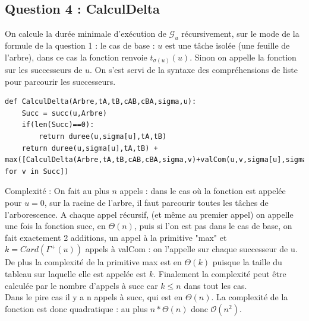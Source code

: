 \documentclass{article}
\begin{document}
\subsection{Question 4 : CalculDelta}
On calcule la durée minimale d'exécution de $\mathcal{G}_u$ récursivement, sur le mode de la formule de la question 1 : 
le cas de base : $u$ est une tâche isolée (une feuille de l'arbre), dans ce cas la fonction renvoie $t_{\sigma(u)}(u)$. Sinon on appelle la fonction sur les successeurs de $u$. On s'est servi de la syntaxe des compréhensions de liste pour parcourir les successeurs.
\begin{lstlisting}
def CalculDelta(Arbre,tA,tB,cAB,cBA,sigma,u):
    Succ = succ(u,Arbre)
    if(len(Succ)==0):
        return duree(u,sigma[u],tA,tB)
    return duree(u,sigma[u],tA,tB) + max([CalculDelta(Arbre,tA,tB,cAB,cBA,sigma,v)+valCom(u,v,sigma[u],sigma[v],cAB,cBA) for v in Succ])
\end{lstlisting}

Complexité : 
On fait au plus $n$ appels : dans le cas où la fonction est appelée pour $u = 0$, sur la racine de l'arbre, il faut parcourir toutes les tâches de l'arborescence. 
A chaque appel récursif, (et même au premier appel) on appelle une fois la fonction succ, en $\Theta(n)$, puis si l'on est pas dans le cas de base, on fait exactement 2 additions, un appel à la primitive "max" et $k = Card(\Gamma^{+}(u))$ appels à valCom : on l'appelle sur chaque successeur de u. De plus la complexité de la primitive max est en $\Theta(k)$ puisque la taille du tableau sur laquelle elle est appelée est $k$. Finalement la complexité peut être calculée par le nombre d'appels à succ car $k \leq n$ dans tout les cas.\\
Dans le pire cas il y a n appels à succ, qui est en $\Theta(n)$. La complexité de la fonction est donc quadratique : au plus  $n*\Theta(n)$ donc $ \mathcal{O}(n^2)$.
\end{document}

